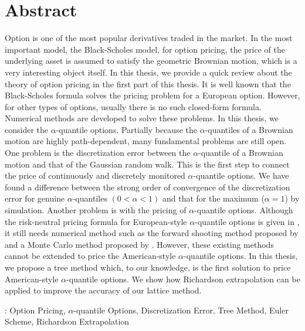 \chapter{Abstract}
Option is one of the most popular derivatives traded in the market. 
In the most important model, the Black-Scholes model, for option pricing, the price of the underlying asset is assumed to satisfy the geometric Brownian motion, which is a very interesting object itself. In this thesis, we provide a quick review about the theory of option pricing in the first part of this thesis. It is well known that the Black-Scholes formula solves the pricing problem for a European option. However, for other types of options, usually there is no such closed-form formula. Numerical methods are developed to solve these problems. In this thesis, we consider the $\alpha$-quantile options. Partially because the $\alpha$-quantiles of a Brownian motion are highly path-dependent, many fundamental problems are still open. One problem is the discretization error between the $\alpha$-quantile of a Brownian motion and that of the Gaussian random walk. This is the first step to connect the price of continuously and discretely monitored $\alpha$-quantile options. We have found a difference between the strong order of convergence of the discretization error for genuine $\alpha$-quantiles $(0< \alpha < 1)$ and that for the maximum ($\alpha=1$) by simulation. Another problem is with the pricing of $\alpha$-quantile options. Although the risk-neutral pricing formula for European-style $\alpha$-quantile options is given in \cite{Dassios1995}, it still needs numerical method such as the forward shooting method proposed by \cite{Kwok2001} and a Monte Carlo method proposed by \cite{Laura2001}. However, these existing methods cannot be extended to price the American-style $\alpha$-quantile options. In this thesis, we propose a tree method which, to our knowledge, is the first solution to price American-style $\alpha$-quantile options. We show how Richardson extrapolation can be applied to improve the accuracy of our lattice method. 
\vspace{1cm}

: Option Pricing, $\alpha$-quantile Options, Discretization Error, Tree Method, Euler Scheme, Richardson Extrapolation
